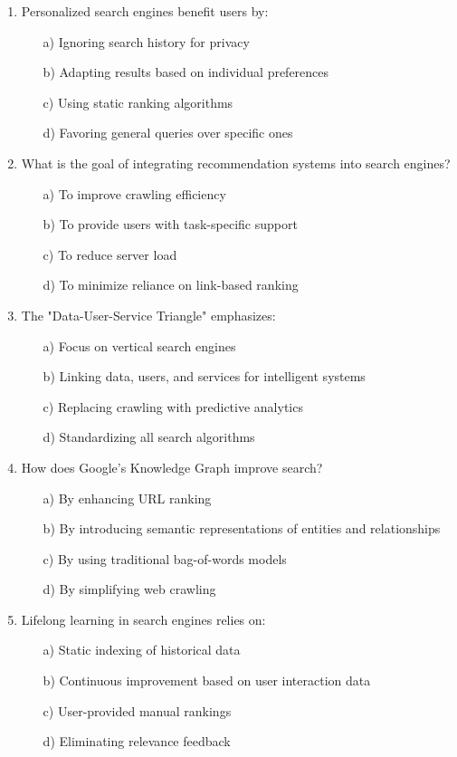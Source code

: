 \documentclass[8pt]{extarticle}
\begin{document}
\begin{multicols}{2}
\begin{enumerate}
\item Personalized search engines benefit users by:
\begin{itemize}
\item[a)] Ignoring search history for privacy
\item[b)] Adapting results based on individual preferences
\item[c)] Using static ranking algorithms
\item[d)] Favoring general queries over specific ones
\end{itemize}

\item What is the goal of integrating recommendation systems into search engines?
\begin{itemize}
\item[a)] To improve crawling efficiency
\item[b)] To provide users with task-specific support
\item[c)] To reduce server load
\item[d)] To minimize reliance on link-based ranking
\end{itemize}

\item The "Data-User-Service Triangle" emphasizes:
\begin{itemize}
\item[a)] Focus on vertical search engines
\item[b)] Linking data, users, and services for intelligent systems
\item[c)] Replacing crawling with predictive analytics
\item[d)] Standardizing all search algorithms
\end{itemize}

\item How does Google's Knowledge Graph improve search?
\begin{itemize}
\item[a)] By enhancing URL ranking
\item[b)] By introducing semantic representations of entities and relationships
\item[c)] By using traditional bag-of-words models
\item[d)] By simplifying web crawling
\end{itemize}

\item Lifelong learning in search engines relies on:
\begin{itemize}
\item[a)] Static indexing of historical data
\item[b)] Continuous improvement based on user interaction data
\item[c)] User-provided manual rankings
\item[d)] Eliminating relevance feedback
\end{itemize}


\end{enumerate}
\end{multicols}
\end{document}
